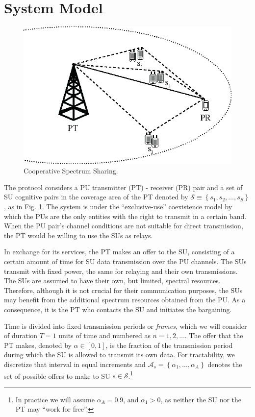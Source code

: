 \section{System Model}\label{sec:Sys}

\begin{figure}[!t]
\centering
\includegraphics{geo.eps}
\caption{Cooperative Spectrum Sharing.}
\label{fig:geo}
\end{figure}

The protocol considers a PU transmitter (PT) - receiver (PR) pair and a set of SU cognitive pairs in the coverage area of the PT denoted by $\mathcal{S}\equiv\left\{s_1,s_2,\ldots,s_S\right\}$, as in Fig. \ref{fig:geo}.
The system is under the ``exclusive-use'' coexistence model by which the PUs are the only entities with the right to transmit in a certain band. 
When the PU pair's channel conditions are not suitable for direct transmission, the PT would be willing to use the SUs as relays.

In exchange for its services, the PT makes an offer to the SU, consisting of a certain amount of time for SU data transmission over the PU channels. 
The SUs transmit with fixed power, the same for relaying and their own transmissions. 
The SUs are assumed to have their own, but limited, spectral resources. Therefore, although it is not crucial for their communication purposes, the SUs may benefit from the additional spectrum resources obtained from the PU.
As a consequence, it is the PT who contacts the SU and initiates the bargaining.

Time is divided into fixed transmission periods or \textit{frames}, which we will consider of duration $T = 1$ units of time and numbered as $n=1,2,\ldots$. 
The offer that the PT makes, denoted by $\alpha \in [0,1]$, is the fraction of the transmission period during which the SU is allowed to transmit its own data.
For tractability, we discretize that interval in equal increments and $\mathcal{A}_s = \left\{\alpha_{1},\ldots,\alpha_{A}\right\}$ denotes the set of possible offers to make to SU $s \in \mathcal{S}$.\footnote{In practice we will assume $\alpha_A = 0.9$, and $\alpha_1>0$, as neither the SU nor the PT may ``work for free''.} 

